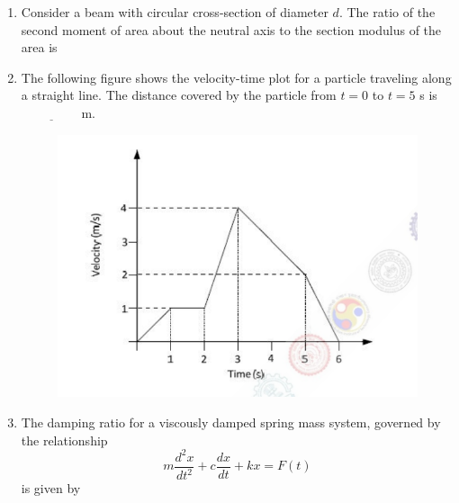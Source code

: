 \documentclass[journal]{IEEEtran}
\begin{document}
\begin{enumerate}[leftmargin=0pt]
    \hfill{}

    \item Consider a beam with circular cross-section of diameter $d$. The ratio of the second moment of area about the neutral axis to the section modulus of the area is

    \hfill{}

    \begin{enumerate}
    \end{enumerate}

    \item The following figure shows the velocity-time plot for a particle traveling along a straight line. The distance covered by the particle from $t = 0$ to $t = 5$ s is
    $\underline{\hspace{2cm}}$m.
    \begin{figure}[h]
\centering
\includegraphics[width=0.5\columnwidth]{Figs/image (22).png}
\caption*{}
\label{fig:17}
\end{figure}

    \hfill{}


    \item The damping ratio for a viscously damped spring mass system, governed by the relationship
    \[
        m \frac{d^2 x}{dt^2} + c \frac{dx}{dt} + k x = F(t)
    \]
    is given by

    \hfill{}
    
    \begin{enumerate}
    \end{enumerate}
    

\end{enumerate}
\end{document}
